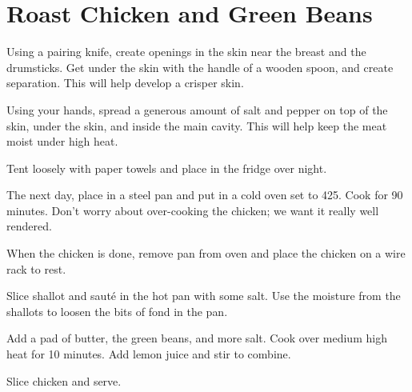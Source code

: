 \section{Roast Chicken and Green Beans}
\begin{recipe}



Using a pairing knife, create openings in the skin near the breast and the drumsticks. Get under the skin with the handle of a wooden spoon, and create separation. This will help develop a crisper skin.

Using your hands, spread a generous amount of salt and pepper on top of the skin, under the skin, and inside the main cavity. This will help keep the meat moist under high heat.

Tent loosely with paper towels and place in the fridge over night.

The next day, place in a steel pan and put in a cold oven set to 425.
Cook for 90 minutes. Don't worry about over-cooking the chicken; we want it really well rendered.


When the chicken is done, remove pan from oven and place the chicken on a wire rack to rest.

Slice shallot and sauté in the hot pan with some salt. Use the moisture from the shallots to loosen the bits of fond in the pan.

Add a pad of butter, the green beans, and more salt. Cook over medium high heat for 10 minutes. Add lemon juice and stir to combine.

Slice chicken and serve.

\end{recipe}
